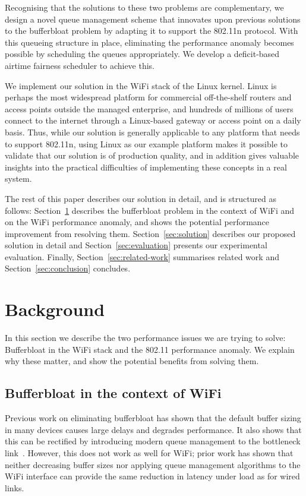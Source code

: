 \documentclass[english]{scrartcl}
\begin{document}
Recognising that the solutions to these two problems are complementary, we
design a novel queue management scheme that innovates upon previous solutions to
the bufferbloat problem by adapting it to support the 802.11n protocol. With
this queueing structure in place, eliminating the performance anomaly becomes
possible by scheduling the queues appropriately. We develop a deficit-based
airtime fairness scheduler to achieve this.

We implement our solution in the WiFi stack of the Linux kernel. Linux is
perhaps the most widespread platform for commercial off-the-shelf routers and
access points outside the managed enterprise, and hundreds of millions of users
connect to the internet through a Linux-based gateway or access point on a daily
basis. Thus, while our solution is generally applicable to any platform that
needs to support 802.11n, using Linux as our example platform makes it possible
to validate that our solution is of production quality, and in addition gives
valuable insights into the practical difficulties of implementing these concepts
in a real system.

The rest of this paper describes our solution in detail, and is structured as
follows: Section \ref{sec:background} describes the bufferbloat problem in the
context of WiFi and on the WiFi performance anomaly, and shows the potential
performance improvement from resolving them. Section \ref{sec:solution}
describes our proposed solution in detail and Section \ref{sec:evaluation}
presents our experimental evaluation. Finally, Section \ref{sec:related-work}
summarises related work and Section \ref{sec:conclusion} concludes.

\section{Background}
\label{sec:background}
In this section we describe the two performance issues we are trying to solve:
Bufferbloat in the WiFi stack and the 802.11 performance anomaly. We explain why
these matter, and show the potential benefits from solving them.

\subsection{Bufferbloat in the context of WiFi}
\label{sec:org4a60b30}
Previous work on eliminating bufferbloat has shown that the default buffer
sizing in many devices causes large delays and degrades performance. It also
shows that this can be rectified by introducing modern queue management to the
bottleneck link \cite{good-bad-wifi,cablelabs,much-ado}. However, this does not
work as well for WiFi; prior work has shown that neither decreasing buffer sizes
\cite{showail_buffer_2016} nor applying queue management algorithms to the WiFi
interface \cite{good-bad-wifi} can provide the same reduction in latency under
load as for wired links.
\end{document}
